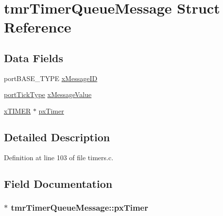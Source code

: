 \hypertarget{structtmr_timer_queue_message}{\section{tmr\-Timer\-Queue\-Message Struct Reference}
\label{structtmr_timer_queue_message}
}
\subsection*{Data Fields}
\begin{DoxyCompactItemize}
\item 
port\-B\-A\-S\-E\-\_\-\-T\-Y\-P\-E \hyperlink{structtmr_timer_queue_message_a3938c01850a4c0e7254bd8a585d4046e}{x\-Message\-I\-D}
\item 
\hyperlink{_s_t_m32_f10x_2_libraries_2_free_r_t_o_s_2_source_2portable_2_g_c_c_2_a_r_m___c_m3_2portmacro_8h_a4d746b2ff8fafc490b764c66411ec457}{port\-Tick\-Type} \hyperlink{structtmr_timer_queue_message_a3bab3174777bfdfa6ab4d17f84c034da}{x\-Message\-Value}
\item 
\hyperlink{_common_2_libraries_2_free_r_t_o_s_2_source_2timers_8c_aed29d969267ced8c780ec770d1eea1a5}{x\-T\-I\-M\-E\-R} $\ast$ \hyperlink{structtmr_timer_queue_message_ae17d35767d4dd70119b11bed277d9c08}{px\-Timer}
\end{DoxyCompactItemize}


\subsection{Detailed Description}


Definition at line 103 of file timers.\-c.



\subsection{Field Documentation}
\hypertarget{structtmr_timer_queue_message_ae17d35767d4dd70119b11bed277d9c08}{
\subsubsection[{px\-Timer}]{ $\ast$ tmr\-Timer\-Queue\-Message\-::px\-Timer}}\label{structtmr_timer_queue_message_ae17d35767d4dd70119b11bed277d9c08}


